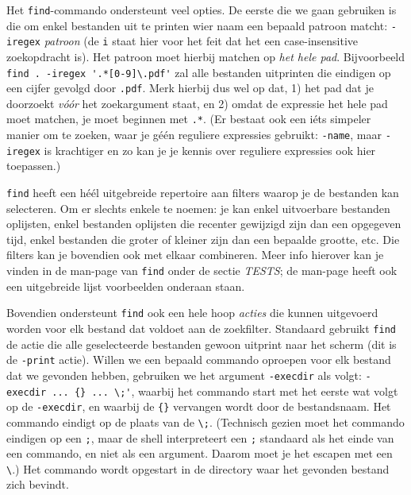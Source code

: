 \documentclass[a4paper,twoside,openany]{memoir}
\begin{document}
Het \verb!find!-commando ondersteunt veel opties. De eerste die we gaan
gebruiken is die om enkel bestanden uit te printen wier naam een bepaald patroon
matcht: \verb!-iregex! \emph{patroon} (de \verb!i! staat hier voor het feit
dat het een case-insensitive zoekopdracht is). Het patroon moet hierbij matchen
op \emph{het hele pad}. Bijvoorbeeld \verb!find . -iregex '.*[0-9]\.pdf'! zal
alle bestanden uitprinten die eindigen op een cijfer gevolgd door \verb!.pdf!.
Merk hierbij dus wel op dat, 1) het pad dat je doorzoekt \emph{vóór} het
zoekargument staat, en 2) omdat de expressie het hele pad moet matchen, je moet
beginnen met \verb!.*!. (Er bestaat ook een iéts simpeler manier om te zoeken,
waar je géén reguliere expressies gebruikt: \verb!-name!, maar \verb!-iregex!
is krachtiger en zo kan je je kennis over reguliere expressies ook hier
toepassen.)

\verb!find! heeft een héél uitgebreide repertoire aan filters waarop je de
bestanden kan selecteren. Om er slechts enkele te noemen: je kan enkel
uitvoerbare bestanden oplijsten, enkel bestanden oplijsten die recenter
gewijzigd zijn dan een opgegeven tijd, enkel bestanden die groter of kleiner
zijn dan een bepaalde grootte, etc. Die filters kan je bovendien ook met elkaar
combineren. Meer info hierover kan je vinden in de man-page van \verb!find!
onder de sectie \emph{TESTS}; de man-page heeft ook een uitgebreide lijst
voorbeelden onderaan staan.

Bovendien ondersteunt \verb!find! ook een hele hoop \emph{acties} die kunnen
uitgevoerd worden voor elk bestand dat voldoet aan de zoekfilter. Standaard
gebruikt \verb!find! de actie die alle geselecteerde bestanden gewoon uitprint
naar het scherm (dit is de \verb!-print! actie). Willen we een bepaald commando
oproepen voor elk bestand dat we gevonden hebben, gebruiken we het argument
\verb!-execdir! als volgt: \verb!-execdir ... {} ... \;'!, waarbij het commando
start met het eerste wat volgt op de \verb!-execdir!, en waarbij de \verb!{}!
vervangen wordt door de bestandsnaam. Het commando eindigt op de plaats van de
\verb!\;!. (Technisch gezien moet het commando eindigen op een \verb!;!, maar
de shell interpreteert een \verb!;! standaard als het einde van een commando,
en niet als een argument. Daarom moet je het escapen met een \verb!\!.) Het
commando wordt opgestart in de directory waar het gevonden bestand zich
bevindt.
\end{document}
